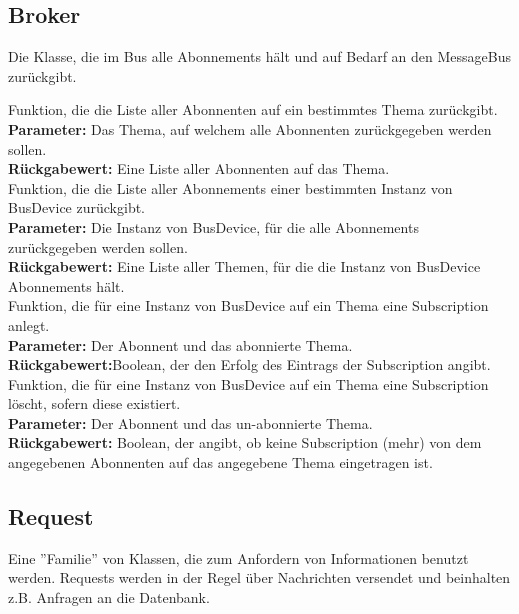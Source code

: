 \documentclass[entwurf.tex]{subfiles}
\begin{document}
		\subsection{Broker}
		\label{Class:Broker}
		Die Klasse, die im Bus alle Abonnements hält und auf Bedarf an den MessageBus zurückgibt.\\
		
		\begin{description}
		Funktion, die die Liste aller Abonnenten auf ein bestimmtes Thema zurückgibt. \\
		\textbf{Parameter:} Das Thema, auf welchem alle Abonnenten zurückgegeben werden sollen.	\\
		\textbf{Rückgabewert:} Eine Liste aller Abonnenten auf das Thema.	\\
		

		Funktion, die die Liste aller Abonnements einer bestimmten Instanz von BusDevice zurückgibt. \\
		\textbf{Parameter:} Die Instanz von BusDevice, für die alle Abonnements zurückgegeben werden sollen.	\\
		\textbf{Rückgabewert:} Eine Liste aller Themen, für die die Instanz von BusDevice Abonnements hält. 	\\
		
		Funktion, die für eine Instanz von BusDevice auf ein Thema eine Subscription anlegt. \\
		\textbf{Parameter:} Der Abonnent und das abonnierte Thema. \\
		\textbf{Rückgabewert:}Boolean, der den Erfolg des Eintrags der Subscription angibt. \\
		
		Funktion, die für eine Instanz von BusDevice auf ein Thema eine Subscription löscht, sofern diese existiert. \\
		\textbf{Parameter:} Der Abonnent und das un-abonnierte Thema. \\
		\textbf{Rückgabewert:} Boolean, der angibt, ob keine Subscription (mehr) von dem angegebenen Abonnenten auf das angegebene Thema eingetragen ist. \\
		\end{description}
		
		\subsection{Request}
		\label{ClassFamily:Request}
		Eine ''Familie'' von Klassen, die zum Anfordern von Informationen benutzt werden. Requests werden in der Regel über Nachrichten versendet und beinhalten z.B. Anfragen an die Datenbank.
		
\end{document}
